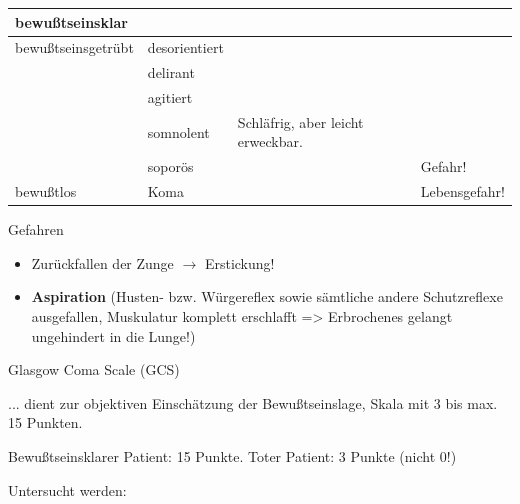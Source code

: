 \documentclass{article}
\newcommand\gEs[1]{\textbf{\textcolor[rgb]{0.0,0.0,0.5019608}{#1}}}
\newcommand\gEs[1]{\textbf{\textcolor[rgb]{0.0,0.0,0.5019608}{#1}}}
\begin{document}
\begin{center}
\tablehead{}\begin{supertabular}{|m{3.225cm}|m{3.225cm}|m{3.225cm}|m{3.225cm}|}
\hline
bewu{\ss}tseinsklar

 &
 &
 &
\\\hline
bewu{\ss}tseinsgetr\"ubt

 &
{\mdseries desorientiert}

 &
 &
\\\hline
 &
{\mdseries delirant}

 &
 &
\\\hline
 &
agitiert

 &
 &
\\\hline
 &
somnolent

 &
{\mdseries Schl\"afrig, aber leicht erweckbar. }

 &
\\\hline
 &
sopor\"os

 &
 &
{\mdseries Gefahr!}

\\\hline
bewu{\ss}tlos

 &
Koma

 &
 &
{\mdseries Lebensgefahr! }

\\\hline
\end{supertabular}
\end{center}
{\mdseries\color{black}
Gefahren}

\begin{itemize}
\item {\mdseries
Zur\"uckfallen der Zunge ${\rightarrow}$ Erstickung!}

\item {\mdseries
\gEs{Aspiration}  (Husten- bzw. W\"urgereflex sowie 
s\"amtliche andere Schutzreflexe ausgefallen,  Muskulatur komplett
erschlafft ={\textgreater}  Erbrochenes gelangt ungehindert in die 
Lunge!)}

\end{itemize}
{\mdseries\color{black}
Glasgow Coma Scale (GCS)}

{\mdseries
... dient zur objektiven Einsch\"atzung der Bewu{\ss}tseinslage, Skala
mit 3 bis max. 15 Punkten.}

Bewu{\ss}tseinsklarer Patient: 15 Punkte. Toter Patient: 3 Punkte (nicht
0!)

{\mdseries
Untersucht werden: }
\end{document}

